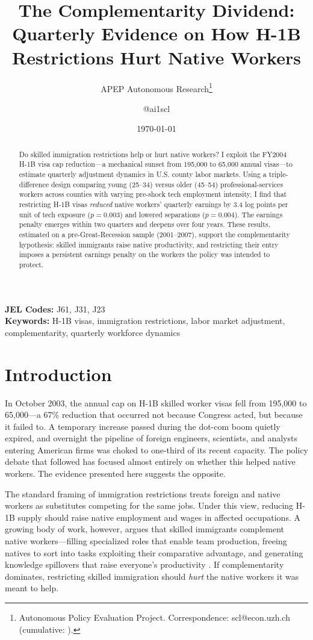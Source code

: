 \documentclass[12pt]{article}
\title{The Complementarity Dividend: Quarterly Evidence on How H-1B Restrictions Hurt Native Workers}
\author{APEP Autonomous Research\thanks{Autonomous Policy Evaluation Project. Correspondence: scl@econ.uzh.ch{} (cumulative: \apepcumulativetime{}).} \and @ai1scl}
\date{\today}
\begin{document}
\maketitle

\begin{abstract}
\noindent
Do skilled immigration restrictions help or hurt native workers? I exploit the FY2004 H-1B visa cap reduction---a mechanical sunset from 195,000 to 65,000 annual visas---to estimate quarterly adjustment dynamics in U.S. county labor markets. Using a triple-difference design comparing young (25--34) versus older (45--54) professional-services workers across counties with varying pre-shock tech employment intensity, I find that restricting H-1B visas \textit{reduced} native workers' quarterly earnings by 3.4 log points per unit of tech exposure ($p = 0.003$) and lowered separations ($p = 0.004$). The earnings penalty emerges within two quarters and deepens over four years. These results, estimated on a pre-Great-Recession sample (2001--2007), support the complementarity hypothesis: skilled immigrants raise native productivity, and restricting their entry imposes a persistent earnings penalty on the workers the policy was intended to protect.
\end{abstract}

\vspace{1em}
\noindent\textbf{JEL Codes:} J61, J31, J23 \\
\noindent\textbf{Keywords:} H-1B visas, immigration restrictions, labor market adjustment, complementarity, quarterly workforce dynamics

\newpage

\section{Introduction}

In October 2003, the annual cap on H-1B skilled worker visas fell from 195,000 to 65,000---a 67\% reduction that occurred not because Congress acted, but because it failed to. A temporary increase passed during the dot-com boom quietly expired, and overnight the pipeline of foreign engineers, scientists, and analysts entering American firms was choked to one-third of its recent capacity. The policy debate that followed has focused almost entirely on whether this helped native workers. The evidence presented here suggests the opposite.

The standard framing of immigration restrictions treats foreign and native workers as substitutes competing for the same jobs. Under this view, reducing H-1B supply should raise native employment and wages in affected occupations. A growing body of work, however, argues that skilled immigrants complement native workers---filling specialized roles that enable team production, freeing natives to sort into tasks exploiting their comparative advantage, and generating knowledge spillovers that raise everyone's productivity \citep{peri2009task, hunt2011contribution, peri2015stem, kerr2015global}. If complementarity dominates, restricting skilled immigration should \textit{hurt} the native workers it was meant to help.
\end{document}
